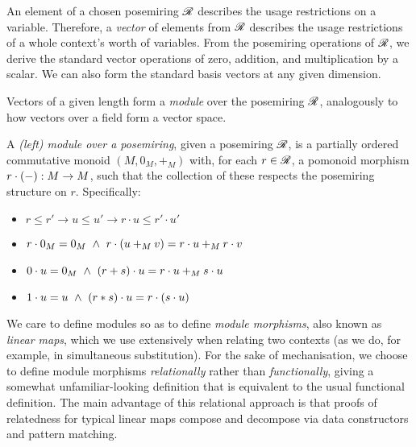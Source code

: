An element of a chosen posemiring $\mathscr R$ describes the usage restrictions on
a variable.
Therefore, a \emph{vector} of elements from $\mathscr R$ describes the usage
restrictions of a whole context's worth of variables.
From the posemiring operations of $\mathscr R$, we derive the standard vector
operations of zero, addition, and multiplication by a scalar.
We can also form the standard basis vectors at any given dimension.

Vectors of a given length form a \emph{module} over the posemiring $\mathscr R$,
analogously to how vectors over a field form a vector space.

\begin{definition}
  A \emph{(left) module over a posemiring}, given a posemiring $\mathscr R$, is a
  partially ordered commutative monoid $(M, 0_M, +_M)$ with, for each
  $r \in \mathscr R$, a pomonoid morphism $r \cdot \plr{-} : M \to M$, such that the
  collection of these respects the posemiring structure on $r$.
  Specifically:
  \begin{itemize}
    \item $r \leq r' \to u \leq u' \to r \cdot u \leq r' \cdot u'$
    \item $r \cdot 0_M = 0_M
      \land r \cdot \plr{u +_M v} = r \cdot u +_M r \cdot v$
    \item $0 \cdot u = 0_M
      \land \plr{r + s} \cdot u = r \cdot u +_M s \cdot u$
    \item $1 \cdot u = u
      \land \plr{r * s} \cdot u = r \cdot \plr{s \cdot u}$
  \end{itemize}
\end{definition}

We care to define modules so as to define \emph{module morphisms}, also known
as \emph{linear maps}, which we use extensively when relating two contexts (as
we do, for example, in simultaneous substitution).
For the sake of mechanisation, we choose to define module morphisms
\emph{relationally} rather than \emph{functionally}, giving a somewhat
unfamiliar-looking definition that is equivalent to the usual functional
definition.
The main advantage of this relational approach is that proofs of relatedness
for typical linear maps compose and decompose via data constructors and
pattern matching.

